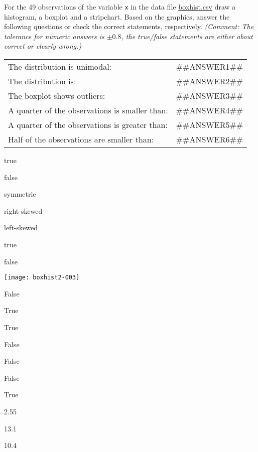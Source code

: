 
\begin{question}
For the 49 observations of the variable \texttt{x} in the data file
\url{boxhist.csv} draw a histogram, a boxplot and a stripchart.
Based on the graphics, answer the following questions or check the correct
statements, respectively. \emph{(Comment: The tolerance for numeric answers is
$\pm0.8$, the true/false statements are either about correct or clearly wrong.)}

\begin{tabular}{lr}
The distribution is unimodal:                         & ##ANSWER1## \\
The distribution is:                                  & ##ANSWER2## \\
The boxplot shows outliers:                           & ##ANSWER3## \\
A quarter of the observations is smaller than:        & ##ANSWER4## \\
A quarter of the observations is greater than:        & ##ANSWER5## \\
Half of the observations are smaller than: & ##ANSWER6##
\end{tabular}

\begin{answerlist}
  \item true
  \item false
  \item symmetric
  \item right-skewed
  \item left-skewed
  \item true
  \item false
  \item 
  \item 
  \item 
\end{answerlist}
\end{question}

\begin{solution}
\texttt{[image: boxhist2-003]}

\begin{answerlist}
  \item False
  \item True
  \item True
  \item False
  \item False
  \item False
  \item True
  \item 2.55
  \item 13.1
  \item 10.4
\end{answerlist}
\end{solution}

